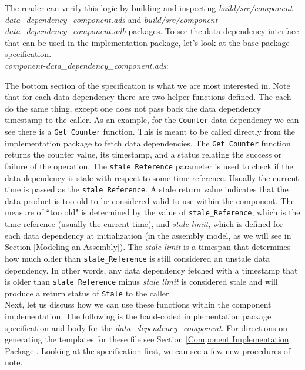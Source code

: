 The reader can verify this logic by building and inspecting \textit{build/src/component-data\_dependency\_component.ads} and \textit{build/src/component-data\_dependency\_component.adb} packages. To see the data dependency interface that can be used in the implementation package, let's look at the base package specification. \\

\textit{component-data\_dependency\_component.ads}:

The bottom section of the specification is what we are most interested in. Note that for each data dependency there are two helper functions defined. The each do the same thing, except one does not pass back the data dependency timestamp to the caller. As an example, for the \texttt{Counter} data dependency we can see there is a \texttt{Get\_Counter} function. This is meant to be called directly from the implementation package to fetch data dependencies. The \texttt{Get\_Counter} function returns the counter value, its timestamp, and a status relating the success or failure of the operation. The \texttt{stale\_Reference} parameter is used to check if the data dependency is stale with respect to some time reference. Usually the current time is passed as the \texttt{stale\_Reference}. A stale return value indicates that the data product is too old to be considered valid to use within the component. The measure of ``too old" is determined by the value of \texttt{stale\_Reference}, which is the time reference (usually the current time), and \textit{stale limit}, which is defined for each data dependency at initialization (in the assembly model, as we will see in Section \ref{Modeling an Assembly}). The \textit{stale limit} is a timespan that determines how much older than \texttt{stale\_Reference} is still considered an unstale data dependency. In other words, any data dependency fetched with a timestamp that is older than \texttt{stale\_Reference} minus \textit{stale limit} is considered stale and will produce a return status of \texttt{Stale} to the caller. \\

Next, let us discuss how we can use these functions within the component implementation. The following is the hand-coded implementation package specification and body for the \textit{data\_dependency\_component}. For directions on generating the templates for these file see Section \ref{Component Implementation Package}. Looking at the specification first, we can see a few new procedures of note. \\

